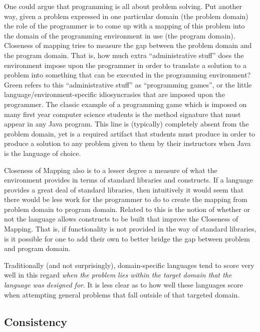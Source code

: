 One could argue that programming is all about problem solving.  Put another way, given a problem expressed in one particular domain (the problem domain) the role of the programmer is to come up with a mapping of this problem into the domain of the programming environment in use (the program domain).  Closeness of mapping tries to measure the gap between the problem domain and the program domain.  That is, how much extra ``administrative stuff'' does the environment impose upon the programmer in order to translate a solution to a problem into something that can be executed in the programming environment?  Green refers to this ``administrative stuff'' as ``programming games'', or the little language/environment-specific idiosyncrasies that are imposed upon the programmer.  The classic example of a programming game which is imposed on many first year computer science students is the  method signature that must appear in any Java program.  This line is (typically) completely absent from the problem domain, yet is a required artifact that students must produce in order to produce a solution to any problem given to them by their instructors when Java is the language of choice.

Closeness of Mapping also is to a lesser degree a measure of what the environment provides in terms of standard libraries and constructs.  If a language provides a great deal of standard libraries, then intuitively it would seem that there would be less work for the programmer to do to create the mapping from problem domain to program domain.  Related to this is the notion of whether or not the language allows constructs to be built that improve the Closeness of Mapping.  That is, if functionality is not provided in the way of standard libraries, is it possible for one to add their own to better bridge the gap between
problem and program domain.

Traditionally (and not surprisingly), domain-specific languages tend to score very well in this regard \emph{when the problem lies within the target domain that the language was designed for}.  It is less clear as to how well these languages score when attempting general problems that fall outside of that targeted domain.

\subsection{Consistency}
\label{consistencyoutline}

